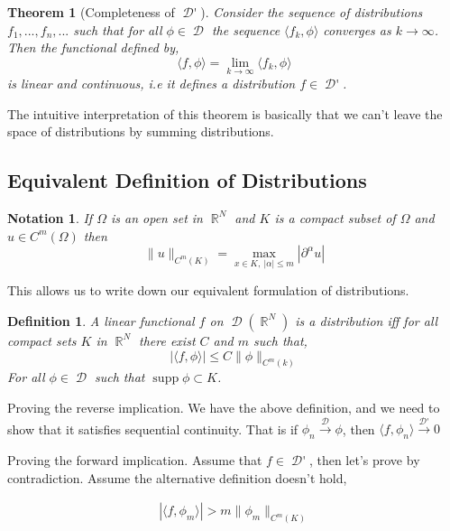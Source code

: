 \documentclass[12pt, a4]{article}
\newtheorem{theorem}{Theorem}[section]
\newtheorem{definition}{Definition}[section]
\newtheorem{notation}{Notation}[section]
\DeclareMathOperator\supp{supp}
\DeclareMathOperator\reals{\mathbb{R}}
\DeclareMathOperator\tfspaceD{\mathcal{D}}
\DeclareMathOperator\dist{\mathcal{D'}}
\begin{document}
\begin{theorem}[Completeness of $\dist$]
    Consider the sequence of distributions $f_1,...,f_n,...$ such that for all $\phi \in \tfspaceD$ the sequence $\langle f_k, \phi \rangle$ converges as $k \rightarrow \infty$. Then the functional defined by, \[ \langle f, \phi \rangle = \lim_{k \rightarrow \infty} \langle f_k, \phi \rangle \] is linear and continuous, i.e it defines a distribution $f \in \dist$.
\end{theorem}

The intuitive interpretation of this theorem is basically that we can't leave the space of distributions by summing distributions.

\subsection{Equivalent Definition of Distributions}

\begin{notation}
    If $\Omega$ is an open set in $\reals^N$ and $K$ is a compact subset of $\Omega$ and $u \in C^m(\Omega)$ then \[ \| u \|_{C^m(K)} = \max_{x \in K, \> |\alpha| \leq m} |\partial^\alpha u| \]
\end{notation}

This allows us to write down our equivalent formulation of distributions.

\begin{definition}
    A linear functional $f$ on $\tfspaceD(\reals^N)$ is a distribution iff for all compact sets $K$ in $\reals^N$ there exist $C$ and $m$ such that,
    \[ |\langle f, \phi \rangle| \leq C \| \phi \|_{C^m(k)}\] For all $\phi \in \tfspaceD$ such that $\supp \phi \subset K$.
\end{definition}

Proving the reverse implication. We have the above definition, and we need to show that it satisfies sequential continuity. That is if $\phi_n \overset{\tfspaceD}{\rightarrow} \phi$, then $\langle f, \phi_n \rangle \overset{\dist}{\rightarrow} 0$

\vspace{5pt}

Proving the forward implication. Assume that $f \in \dist$, then let's prove by contradiction. Assume the alternative definition doesn't hold,

\begin{eqnarray}
    | \langle f, \phi_m \rangle | > m \| \phi_m \|_{C^m(K)}
\end{eqnarray}
\end{document}
